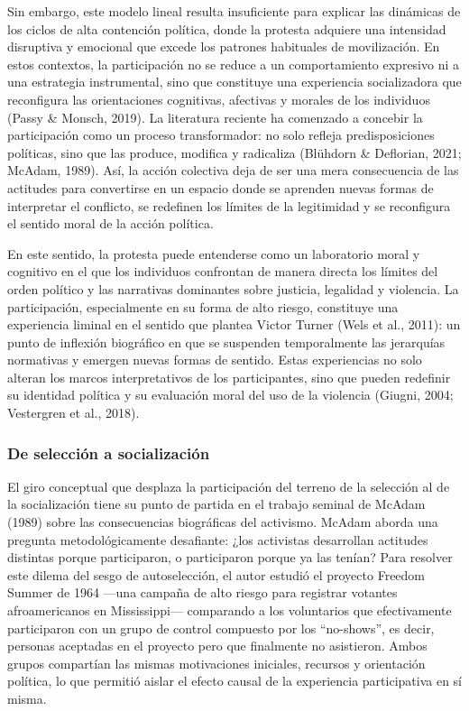 \documentclass[
  13pt,
]{article}
\begin{document}
Sin embargo, este modelo lineal resulta insuficiente para explicar las
dinámicas de los ciclos de alta contención política, donde la protesta
adquiere una intensidad disruptiva y emocional que excede los patrones
habituales de movilización. En estos contextos, la participación no se
reduce a un comportamiento expresivo ni a una estrategia instrumental,
sino que constituye una experiencia socializadora que reconfigura las
orientaciones cognitivas, afectivas y morales de los individuos (Passy
\& Monsch, 2019). La literatura reciente ha comenzado a concebir la
participación como un proceso transformador: no solo refleja
predisposiciones políticas, sino que las produce, modifica y radicaliza
(Blühdorn \& Deflorian, 2021; McAdam, 1989). Así, la acción colectiva
deja de ser una mera consecuencia de las actitudes para convertirse en
un espacio donde se aprenden nuevas formas de interpretar el conflicto,
se redefinen los límites de la legitimidad y se reconfigura el sentido
moral de la acción política.

En este sentido, la protesta puede entenderse como un laboratorio moral
y cognitivo en el que los individuos confrontan de manera directa los
límites del orden político y las narrativas dominantes sobre justicia,
legalidad y violencia. La participación, especialmente en su forma de
alto riesgo, constituye una experiencia liminal en el sentido que
plantea Victor Turner (Wels et al., 2011): un punto de inflexión
biográfico en que se suspenden temporalmente las jerarquías normativas y
emergen nuevas formas de sentido. Estas experiencias no solo alteran los
marcos interpretativos de los participantes, sino que pueden redefinir
su identidad política y su evaluación moral del uso de la violencia
(Giugni, 2004; Vestergren et al., 2018).

\subsubsection{De selección a
socialización}\label{de-selecciuxf3n-a-socializaciuxf3n}

El giro conceptual que desplaza la participación del terreno de la
selección al de la socialización tiene su punto de partida en el trabajo
seminal de McAdam (1989) sobre las consecuencias biográficas del
activismo. McAdam aborda una pregunta metodológicamente desafiante: ¿los
activistas desarrollan actitudes distintas porque participaron, o
participaron porque ya las tenían? Para resolver este dilema del sesgo
de autoselección, el autor estudió el proyecto Freedom Summer de 1964
---una campaña de alto riesgo para registrar votantes afroamericanos en
Mississippi--- comparando a los voluntarios que efectivamente
participaron con un grupo de control compuesto por los ``no-shows'', es
decir, personas aceptadas en el proyecto pero que finalmente no
asistieron. Ambos grupos compartían las mismas motivaciones iniciales,
recursos y orientación política, lo que permitió aislar el efecto causal
de la experiencia participativa en sí misma.
\end{document}
